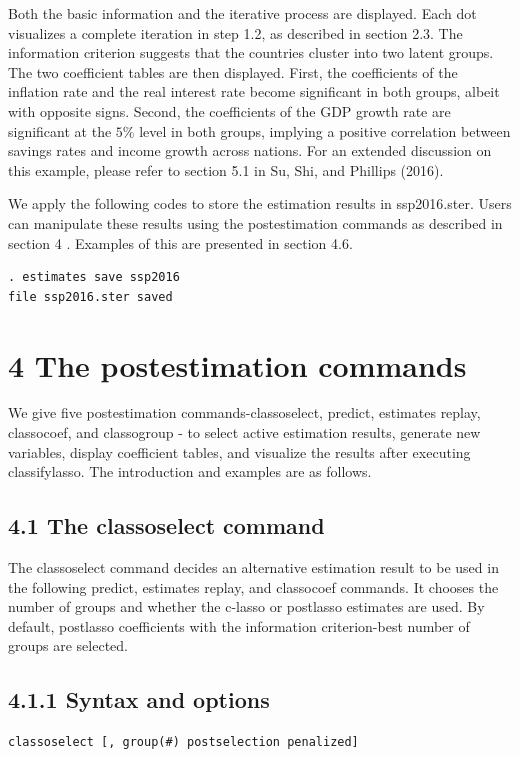 \documentclass[10pt]{article}
\begin{document}
Both the basic information and the iterative process are displayed. Each dot visualizes a complete iteration in step 1.2, as described in section 2.3. The information criterion suggests that the countries cluster into two latent groups. The two coefficient tables are then displayed. First, the coefficients of the inflation rate and the real interest rate become significant in both groups, albeit with opposite signs. Second, the coefficients of the GDP growth rate are significant at the $5 \%$ level in both groups, implying a positive correlation between savings rates and income growth across nations. For an extended discussion on this example, please refer to section 5.1 in Su, Shi, and Phillips (2016).

We apply the following codes to store the estimation results in ssp2016.ster. Users can manipulate these results using the postestimation commands as described in section 4 . Examples of this are presented in section 4.6.

\begin{verbatim}
. estimates save ssp2016
file ssp2016.ster saved
\end{verbatim}

\section*{4 The postestimation commands}
We give five postestimation commands-classoselect, predict, estimates replay, classocoef, and classogroup - to select active estimation results, generate new variables, display coefficient tables, and visualize the results after executing classifylasso. The introduction and examples are as follows.

\subsection*{4.1 The classoselect command}
The classoselect command decides an alternative estimation result to be used in the following predict, estimates replay, and classocoef commands. It chooses the number of groups and whether the c-lasso or postlasso estimates are used. By default, postlasso coefficients with the information criterion-best number of groups are selected.

\subsection*{4.1.1 Syntax and options}
\begin{verbatim}
classoselect [, group(#) postselection penalized]
\end{verbatim}
\end{document}
